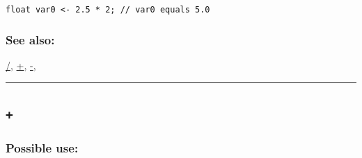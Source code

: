 \documentclass[]{book}
\theoremstyle{definition}
\theoremstyle{definition}
\theoremstyle{definition}
\theoremstyle{remark}
\begin{document}
\begin{verbatim}
 
float var0 <- 2.5 * 2; // var0 equals 5.0
\end{verbatim}

\subsubsection{See also:}\label{see-also-7}

\href{operators-a-to-a.html\#/}{/}, \href{operators-a-to-a.html\#+}{+},
\href{operators-a-to-a.html\#-}{-},

\begin{center}\rule{0.5\linewidth}{\linethickness}\end{center}

\subsection{\texorpdfstring{\texttt{+}}{+}}\label{section-11}

\subsubsection{Possible use:}\label{possible-use-10}
\end{document}

